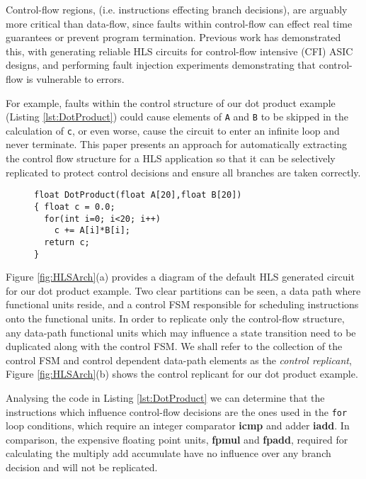 Control-flow regions, (i.e. instructions effecting branch decisions), are arguably more critical
than data-flow, since faults within control-flow can effect real time guarantees
or prevent program termination.
Previous work has demonstrated this,
with \cite{chen2014reliability,chen2015reliability} generating reliable HLS circuits
for control-flow intensive (CFI) ASIC designs,
and \cite{saggese2005microprocessor, nakka2007processor, wong2006soft}
performing fault injection experiments demonstrating that control-flow is
vulnerable to errors.

For example, faults within the control structure of our dot product example (Listing \ref{lst:DotProduct})
could cause elements of \lstinline$A$ and \lstinline$B$ to be skipped in the
calculation of \lstinline$c$,
or even worse, cause the circuit to enter an infinite loop and never terminate.
This paper presents an approach for automatically extracting the control flow structure
for a HLS application so that it can be selectively
replicated to protect control decisions and ensure all branches are taken correctly.

\begin{figure}[t]
\begin{lstlisting}[label={lst:DotProduct}, captionpos=b, caption={Dot Product Example}]
float DotProduct(float A[20],float B[20])
{ float c = 0.0;
  for(int i=0; i<20; i++)
    c += A[i]*B[i];
  return c;
}
\end{lstlisting}
\vspace{-7mm}
\end{figure}

Figure \ref{fig:HLSArch}(a) provides a diagram of the default HLS generated
circuit for our dot product example.
Two clear partitions can be seen, a data path where functional units reside, and a
control FSM responsible for scheduling instructions onto the functional units.
In order to replicate only the control-flow structure,
any data-path functional units which may influence a state transition need to be
duplicated along with the control FSM.
We shall refer to the collection of the control FSM and control dependent data-path elements as
the \emph{control replicant}, Figure \ref{fig:HLSArch}(b) shows the control replicant for our dot product example.

Analysing the code in Listing \ref{lst:DotProduct} we can determine that the instructions
which influence control-flow decisions are the ones used in the \lstinline{for} loop
conditions, which require an integer comparator \textbf{icmp} and adder \textbf{iadd}.
In comparison, the expensive floating point units, \textbf{fpmul} and \textbf{fpadd}, required
for calculating the multiply add accumulate have no
influence over any branch decision and will not be replicated.

